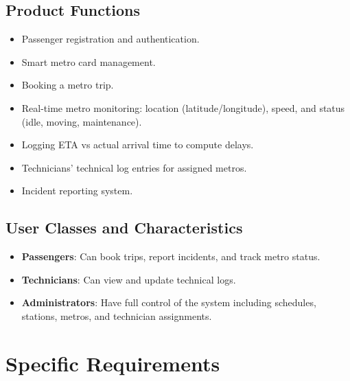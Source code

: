 \documentclass[12pt]{article}
\begin{document}
\subsection{Product Functions}
\begin{itemize}[noitemsep]
  \item Passenger registration and authentication.
  \item Smart metro card management.
  \item Booking a metro trip.
  \item Real-time metro monitoring: location (latitude/longitude), speed, and status (idle, moving, maintenance).
  \item Logging ETA vs actual arrival time to compute delays.
  \item Technicians' technical log entries for assigned metros.
  \item Incident reporting system.
\end{itemize}

\subsection{User Classes and Characteristics}
\begin{itemize}[noitemsep]
  \item \textbf{Passengers}: Can book trips, report incidents, and track metro status.
  \item \textbf{Technicians}: Can view and update technical logs.
  \item \textbf{Administrators}: Have full control of the system including schedules, stations, metros, and technician assignments.
\end{itemize}

\section{Specific Requirements}
\end{document}

